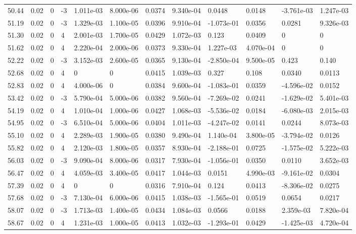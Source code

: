 \documentclass[preview]{standalone}
\begin{document}
{{{{\begin{tabular}{L{1.2cm}C{1.2cm} C{0.3cm}C{0.5cm} C{1.4cm}C{1.4cm} C{1.4cm}C{1.4cm} C{1.6cm}C{1.6cm} C{1.6cm}C{1.6cm}}
  50.44  &  0.02  & 0     & -3 &  1.011e-03  & 8.000e-06  &  0.0374&   9.340e-04& 0.0448 & 0.0148   &  -3.761e-03 & 1.247e-03  \\ 
  51.19  &  0.02  & 0     & -3 &  1.329e-03  & 1.100e-05  &  0.0396&   9.910e-04& -1.073e-01 & 0.0356   &  0.0281 & 9.326e-03  \\ 
  51.30  &  0.02  & 0     &  4 &  2.001e-03  & 1.700e-05  &  0.0429&   1.072e-03& 0.123 & 0.0409   &  0 & 0  \\ 
  51.62  &  0.02  & 0     &  4 &  2.220e-04  & 2.000e-06  &  0.0373&   9.330e-04& 1.227e-03 & 4.070e-04   &  0 & 0  \\ 
  52.22  &  0.02  & 0     & -3 &  3.152e-03  & 2.600e-05  &  0.0365&   9.130e-04& -2.850e-04 & 9.500e-05   &  0.423 & 0.140  \\ 
  52.68  &  0.02  & 0     &  4 &  0  & 0  &  0.0415&   1.039e-03& 0.327 & 0.108   &  0.0340 & 0.0113  \\ 
  52.83  &  0.02  & 0     &  4 &  4.000e-06  & 0  &  0.0384&   9.600e-04& -1.083e-01 & 0.0359   &  -4.596e-02 & 0.0152  \\ 
  53.42  &  0.02  & 0     & -3 &  5.790e-04  & 5.000e-06  &  0.0382&   9.560e-04& -7.269e-02 & 0.0241   &  -1.629e-02 & 5.401e-03  \\ 
  54.19  &  0.02  & 0     &  4 &  1.010e-04  & 1.000e-06  &  0.0427&   1.068e-03& -5.536e-02 & 0.0184   &  -6.080e-03 & 2.015e-03  \\ 
  54.95  &  0.02  & 0     & -3 &  6.510e-04  & 5.000e-06  &  0.0404&   1.011e-03& -4.247e-02 & 0.0141   &  0.0244 & 8.073e-03  \\ 
  55.10  &  0.02  & 0     &  4 &  2.289e-03  & 1.900e-05  &  0.0380&   9.490e-04& 1.140e-04 & 3.800e-05   &  -3.794e-02 & 0.0126  \\ 
  55.82  &  0.02  & 0     &  4 &  2.120e-03  & 1.800e-05  &  0.0357&   8.930e-04& -2.188e-01 & 0.0725   &  -1.575e-02 & 5.222e-03  \\ 
  56.03  &  0.02  & 0     & -3 &  9.090e-04  & 8.000e-06  &  0.0317&   7.930e-04& -1.056e-01 & 0.0350   &  0.0110 & 3.652e-03  \\ 
  56.47  &  0.02  & 0     &  4 &  4.059e-03  & 3.400e-05  &  0.0417&   1.044e-03& 0.0151 & 4.990e-03   &  -9.161e-02 & 0.0304  \\ 
  57.39  &  0.02  & 0     &  4 &  0  & 0  &  0.0316&   7.910e-04& 0.124 & 0.0413   &  -8.306e-02 & 0.0275  \\ 
  57.68  &  0.02  & 0     & -3 &  7.130e-04  & 6.000e-06  &  0.0415&   1.038e-03& -1.565e-01 & 0.0519   &  0.0654 & 0.0217  \\ 
  58.07  &  0.02  & 0     & -3 &  1.713e-03  & 1.400e-05  &  0.0434&   1.084e-03& 0.0566 & 0.0188   &  2.359e-03 & 7.820e-04  \\ 
  58.67  &  0.02  & 0     &  4 &  1.231e-03  & 1.000e-05  &  0.0413&   1.032e-03& -1.293e-01 & 0.0429   &  -1.425e-03 & 4.720e-04  \\ 
\hline 
\end{tabular} 

}}}}
\end{document}
